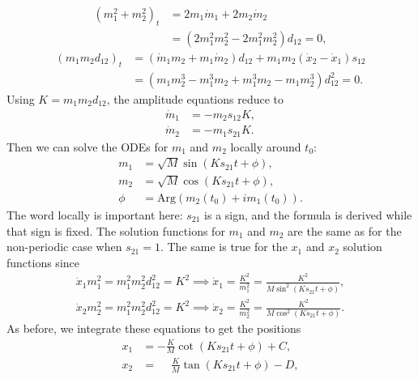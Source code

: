 \documentclass[english,master]{liumaiex}
\theoremstyle{thesisplain}
\theoremstyle{thesisdefinition}
\numberwithin{equation}{section}
\begin{document}
\begin{equation}
\begin{aligned}
    (m_1^2 + m_2^2)_t 
    &= 2m_1\dot{m}_1 + 2m_2\dot{m}_2 \\
    &= (2m_1^2m_2^2 - 2m_1^2m_2^2)d_{12} = 0,
\end{aligned}
\end{equation}
\begin{equation}
\begin{aligned}
	(m_1m_2d_{12})_t
	&= (\dot{m}_1m_2 + m_1\dot{m}_2)d_{12}
	+ m_1m_2(\dot{x}_2 - \dot{x}_1)s_{12} \\
	&=(m_1m_2^3 - m_1^3m_2 + m_1^3m_2 - m_1m_2^3) d_{12}^2 = 0.
\end{aligned}
\end{equation}
%
Using $K=m_1m_2d_{12}$, the amplitude equations reduce to
\begin{equation}
\begin{aligned}
    \dot{m}_1 &= -m_2s_{12}K, \\
    \dot{m}_2 &= -m_1s_{21}K.
\end{aligned}
\end{equation}
%
Then we can solve the ODEs for $m_1$ and $m_2$ locally around $t_0$:
\begin{equation}
\begin{aligned}
    m_1 &= \sqrt{M} \sin(Ks_{21} t + \phi), \\
    m_2 &= \sqrt{M} \cos(Ks_{21} t + \phi), \\
    \phi &= \text{Arg}(m_2(t_0) + i m_1(t_0)).
\end{aligned}
\end{equation}
The word locally is important here: $s_{21}$ is a sign, and the formula is derived while that sign is fixed.
%
The solution functions for $m_1$ and $m_2$ are the same as for the non-periodic case when $s_{21} = 1$. The same is true for the $x_1$ and $x_2$ solution functions since
\begin{align}
	\dot{x}_1m_1^2 = m_1^2m_2^2d_{12}^2 = K^2
	\implies
	\dot{x}_1 = \frac{K^2}{m_1^2} = \frac{K^2}{M\sin^2(Ks_{21}t + \phi)}, \\
	\dot{x}_2m_2^2 = m_1^2m_2^2d_{12}^2 = K^2
	\implies
	\dot{x}_2 = \frac{K^2}{m_2^2} = \frac{K^2}{M\cos^2(Ks_{21}t + \phi)}.
\end{align}
%
As before, we integrate these equations to get the positions
\begin{equation}
\begin{aligned}
    x_1 &= -\frac{K}{M}\cot(Ks_{21}t + \phi) + C,\\
    x_2 &= \phantom{-}\frac{K}{M}\tan(Ks_{21}t + \phi) - D,
\end{aligned}
\end{equation}
\end{document}
